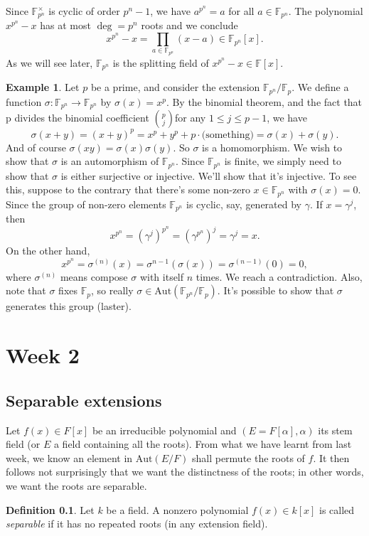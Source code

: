 \documentclass[12pt]{report}
\theoremstyle{definition}
\newtheorem{defn}[thm]{Definition}
\newtheorem{example}[thm]{Example}
\def\FF{\mathbb{F}}
\def\Aut{\mbox{Aut}}
\def\aa{\alpha}
\begin{document}
Since $\FF_{p^n}^\times$ is cyclic of order $p^n-1$, we have $a^{p^n} = a$ for all $a\in \FF_{p^n}$. The polynomial $x^{p^n}-x$ has at most $\deg =  p^n$ roots and we conclude $$x^{p^n}-x = \prod_{a\in \FF_{p^n}} (x-a) \in \FF_{p^n}[x].$$ As we will see later, $\FF_{p^n}$ is the splitting field of $x^{p^n}-x\in \FF[x].$

\begin{example}
    Let $p$ be a prime, and consider the extension $\FF_{p^n}/\FF_p$. We define a function $\sigma: \FF_{p^n} \to \FF_{p^n}$ by $\sigma(x) = x^p$. By the binomial theorem, and the fact that p divides the binomial coefficient $\binom{p}{j}$for any $1 \leq j \leq p-1$, we have $$\sigma(x + y) = (x + y)^p = x^p + y^p + p\cdot \mbox{(something)} = \sigma(x) + \sigma(y).$$
    And of course $\sigma(xy) = \sigma(x)\sigma(y)$. So $\sigma$ is a homomorphism. We wish to show that $\sigma$ is an automorphism of $\FF_{p^n}$. Since $\FF_{p^n}$ is finite, we simply need to show that $\sigma$ is either surjective or injective. We'll show that it's injective. To see this, suppose to the contrary that there's some non-zero $x \in \FF_{p^n}$ with $\sigma(x) = 0$. Since the group of non-zero elements $\FF_{p^n}$ is cyclic, say, generated by $\gamma$. If $x =\gamma^j$, then $$x^{p^n} = (\gamma^j)^{p^n} = (\gamma^{p^n})^j = \gamma^j = x.$$
    On the other hand,  $$x^{p^n}= \sigma^{(n)}(x) = \sigma^{n-1}(\sigma(x)) = \sigma^{(n-1)}(0) = 0,$$ where $\sigma^{(n)}$ means compose $\sigma$ with itself $n$ times. We reach a contradiction.
    Also, note that $\sigma$ fixes $\FF_p$, so really $\sigma \in \Aut(\FF_{p^n}/\FF_p)$. It's possible to show that $\sigma$ generates this group (laster).
\end{example}

\chapter*{Week 2}
\setcounter{chapter}{2}
\section{Separable extensions}
Let $f(x)\in F[x]$ be an irreducible polynomial and $(E=F[\aa],\aa)$ its stem field (or $E$ a field containing all the roots). From what we have learnt from last week, we know an element in $\Aut(E/F)$ shall permute the roots of $f$. It then follows not surprisingly that we want the distinctness of the roots; in other words, we want the roots are separable.

\begin{defn}
    Let $k$ be a field. A nonzero polynomial $f(x) \in k[x]$ is called \emph{separable} if it has no repeated roots (in any extension field). 
\end{defn}
\end{document}

